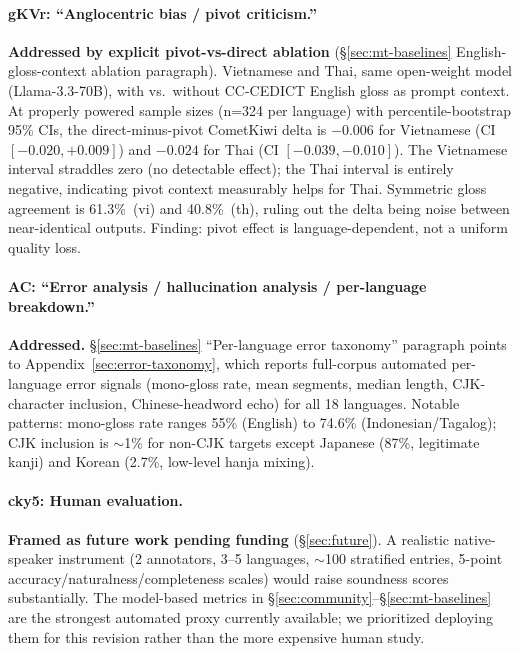 \documentclass[11pt]{article}
\begin{document}
\paragraph{gKVr: ``Anglocentric bias / pivot criticism.''}

\textbf{Addressed by explicit pivot-vs-direct ablation} (\S\ref{sec:mt-baselines} English-gloss-context ablation paragraph). Vietnamese and Thai, same open-weight model (Llama-3.3-70B), with vs.\ without CC-CEDICT English gloss as prompt context. At properly powered sample sizes (n=324 per language) with percentile-bootstrap 95\% CIs, the direct-minus-pivot CometKiwi delta is $-0.006$ for Vietnamese (CI $[-0.020, +0.009]$) and $-0.024$ for Thai (CI $[-0.039, -0.010]$). The Vietnamese interval straddles zero (no detectable effect); the Thai interval is entirely negative, indicating pivot context measurably helps for Thai. Symmetric gloss agreement is 61.3\%~(vi) and 40.8\%~(th), ruling out the delta being noise between near-identical outputs. Finding: pivot effect is language-dependent, not a uniform quality loss.

\paragraph{AC: ``Error analysis / hallucination analysis / per-language breakdown.''}

\textbf{Addressed.} \S\ref{sec:mt-baselines} ``Per-language error taxonomy'' paragraph points to Appendix~\ref{sec:error-taxonomy}, which reports full-corpus automated per-language error signals (mono-gloss rate, mean segments, median length, CJK-character inclusion, Chinese-headword echo) for all 18 languages. Notable patterns: mono-gloss rate ranges 55\% (English) to 74.6\% (Indonesian/Tagalog); CJK inclusion is $\sim$1\% for non-CJK targets except Japanese (87\%, legitimate kanji) and Korean (2.7\%, low-level hanja mixing).

\paragraph{cky5: Human evaluation.}

\textbf{Framed as future work pending funding} (\S\ref{sec:future}). A realistic native-speaker instrument (2 annotators, 3--5 languages, $\sim$100 stratified entries, 5-point accuracy/naturalness/completeness scales) would raise soundness scores substantially. The model-based metrics in \S\ref{sec:community}--\S\ref{sec:mt-baselines} are the strongest automated proxy currently available; we prioritized deploying them for this revision rather than the more expensive human study.
\end{document}
